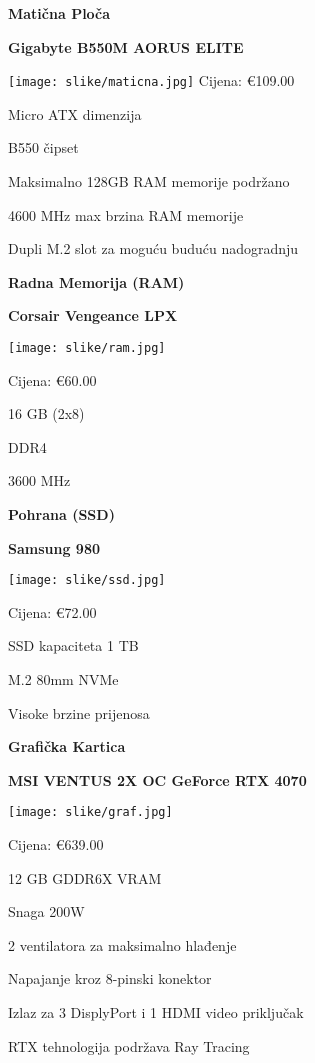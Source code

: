 \documentclass{article}
\begin{document}
\newpage

\large\textbf{Matična Ploča}\par

\textbf{Gigabyte B550M AORUS ELITE}\par
   \texttt{[image: slike/maticna.jpg]}
Cijena: €109.00\par
Micro ATX dimenzija\par
B550 čipset\par
Maksimalno 128GB RAM memorije podržano\par
4600 MHz max brzina RAM memorije\par
Dupli M.2 slot za moguću buduću nadogradnju


\newpage



\large\textbf{Radna Memorija (RAM)}\par

\textbf{Corsair Vengeance LPX}\par
   \texttt{[image: slike/ram.jpg]}\par
Cijena: €60.00\par
16 GB (2x8)\par
DDR4\par
3600 MHz\par


\newpage


\large\textbf{Pohrana (SSD)}\par

\textbf{Samsung 980}\par
   \texttt{[image: slike/ssd.jpg]}\par
Cijena: €72.00\par
SSD kapaciteta 1 TB\par
M.2 80mm NVMe\par
Visoke brzine prijenosa\par



\newpage


\large\textbf{Grafička Kartica}

\textbf{MSI VENTUS 2X OC GeForce RTX 4070}\par
   \texttt{[image: slike/graf.jpg]}\par
Cijena: €639.00\par
12 GB GDDR6X VRAM\par
Snaga 200W\par
2 ventilatora za maksimalno hlađenje\par
Napajanje kroz 8-pinski konektor\par
Izlaz za 3 DisplyPort i 1 HDMI video priključak\par
RTX tehnologija podržava Ray Tracing\par
\end{document}
